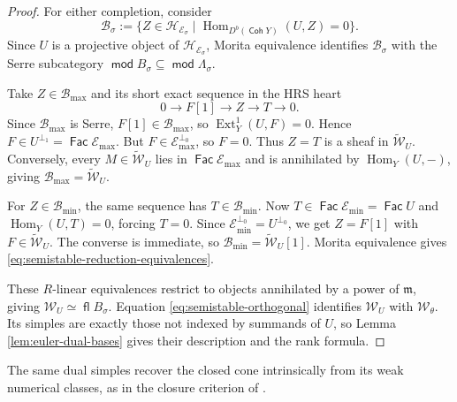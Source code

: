\documentclass[a4paper,reqno]{amsart}
\def\B{\mathcal{B}}
\def\E{\mathcal{E}}
\def\H{\mathcal{H}}
\def\W{\mathcal{W}}
\def\m{\mathfrak{m}}
\DeclareMathOperator{\md}{\mathsf{mod}}
\renewcommand{\mod}{\md}
\DeclareMathOperator{\fl}{\mathsf{fl}}
\DeclareMathOperator{\Fac}{\mathsf{Fac}}
\DeclareMathOperator{\Coh}{\mathsf{Coh}}
\DeclareMathOperator{\Hom}{Hom}
\DeclareMathOperator{\Ext}{Ext}
\theoremstyle{definition}
\begin{document}
\begin{proof}
For either completion, consider
\[
\B_\sigma:=\{Z\in\H_{\E_\sigma}\mid
\Hom_{D^b(\Coh Y)}(U,Z)=0\}.
\]
Since $U$ is a projective object of $\H_{\E_\sigma}$, Morita equivalence identifies $\B_\sigma$ with the Serre subcategory $\mod B_\sigma\subseteq\mod\Lambda_\sigma$.

Take $Z\in\B_{\max}$ and its short exact sequence in the HRS heart
\[
0\longrightarrow F[1]\longrightarrow Z\longrightarrow T\longrightarrow0.
\]
Since $\B_{\max}$ is Serre, $F[1]\in\B_{\max}$, so $\Ext_Y^1(U,F)=0$. Hence $F\in U^{\perp_1}=\Fac\E_{\max}$. But $F\in\E_{\max}^{\perp_0}$, so $F=0$. Thus $Z=T$ is a sheaf in $\widetilde{\W}_U$. Conversely, every $M\in\widetilde{\W}_U$ lies in $\Fac\E_{\max}$ and is annihilated by $\Hom_Y(U,-)$, giving $\B_{\max}=\widetilde{\W}_U$.

For $Z\in\B_{\min}$, the same sequence has $T\in\B_{\min}$. Now $T\in\Fac\E_{\min}=\Fac U$ and $\Hom_Y(U,T)=0$, forcing $T=0$. Since $\E_{\min}^{\perp_0}=U^{\perp_0}$, we get $Z=F[1]$ with $F\in\widetilde{\W}_U$. The converse is immediate, so $\B_{\min}=\widetilde{\W}_U[1]$. Morita equivalence gives \eqref{eq:semistable-reduction-equivalences}.

These $R$-linear equivalences restrict to objects annihilated by a power of $\m$, giving $\W_U\simeq\fl B_\sigma$. Equation \eqref{eq:semistable-orthogonal} identifies $\W_U$ with $\W_\theta$. Its simples are exactly those not indexed by summands of $U$, so Lemma \ref{lem:euler-dual-bases} gives their description and the rank formula.
\end{proof}

The same dual simples recover the closed cone intrinsically from its weak numerical classes, as in the closure criterion of \cite[Lemma 2.15]{Asa21}.
\end{document}
